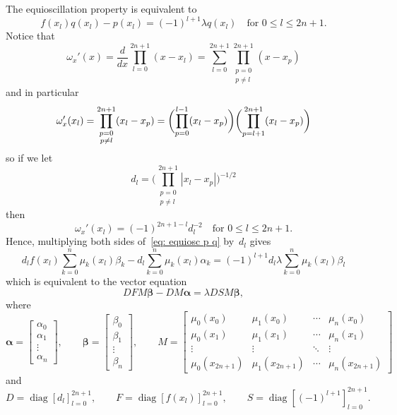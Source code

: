 \documentclass[12pt,a4paper]{article}
\newcommand{\diag}{\operatorname{diag}}
\begin{document}
The equioscillation property is equivalent to
\begin{equation}\label{eq: equiosc p q}
f(x_l)q(x_l)-p(x_l)=(-1)^{l+1}\lambda q(x_l)\quad\text{for $0\le l\le2n+1$.}
\end{equation}
Notice that
\[
\omega_x'(x)=\frac{d}{dx}\prod_{l=0}^{2n+1}(x-x_l)
    =\sum_{l=0}^{2n+1}\prod_{\substack{p=0\\p\ne l}}^{2n+1}(x-x_p)
\]
and in particular
\[
\omega_x'(x_l)=\prod_{\substack{p=0\\p\ne l}}^{2n+1}(x_l-x_p)
    =\biggl(\prod_{p=0}^{l-1}(x_l-x_p)\biggr)
    \biggl(\prod_{p=l+1}^{2n+1}(x_l-x_p)\biggr)\\
\]
so if we let
\[
d_l=\biggl(\prod_{\substack{p=0\\ p\ne l}}^{2n+1}|x_l-x_p|\biggr)^{-1/2}
\]
then
\[
\omega_x'(x_l)=(-1)^{2n+1-l}d_l^{-2}\quad\text{for $0\le l\le 2n+1$.}
\]
Hence, multiplying both sides of~\eqref{eq: equiosc p q} by~$d_l$ gives
\[
d_lf(x_l)\sum_{k=0}^n\mu_k(x_l)\beta_k-d_l\sum_{k=0}^n\mu_k(x_l)\alpha_k
    =(-1)^{l+1}d_l\lambda\sum_{k=0}^n\mu_k(x_l)\beta_l
\]
which is equivalent to the vector equation
\begin{equation}\label{eq: equiosc matrix}
DFM\boldsymbol{\beta}-DM\boldsymbol{\alpha}=\lambda DSM\boldsymbol{\beta},
\end{equation}
where
\[
\boldsymbol{\alpha}=\begin{bmatrix}
\alpha_0\\ \alpha_1\\ \vdots\\\alpha_n \end{bmatrix},\qquad
\boldsymbol{\beta}=\begin{bmatrix}
\beta_0\\ \beta_1\\ \vdots\\ \beta_n\end{bmatrix},\qquad
M=\begin{bmatrix}
\mu_0(x_0)&\mu_1(x_0)&\cdots&\mu_n(x_0)\\
\mu_0(x_1)&\mu_1(x_1)&\cdots&\mu_n(x_1)\\
\vdots    &\vdots    &\ddots&\vdots\\
\mu_0(x_{2n+1})&\mu_1(x_{2n+1})&\cdots&\mu_n(x_{2n+1})
\end{bmatrix}
\]
and 
\[
D=\diag[d_l]_{l=0}^{2n+1},\qquad
F=\diag[f(x_l)]_{l=0}^{2n+1},\qquad
S=\diag[(-1)^{l+1}]_{l=0}^{2n+1}.
\]
\end{document}
